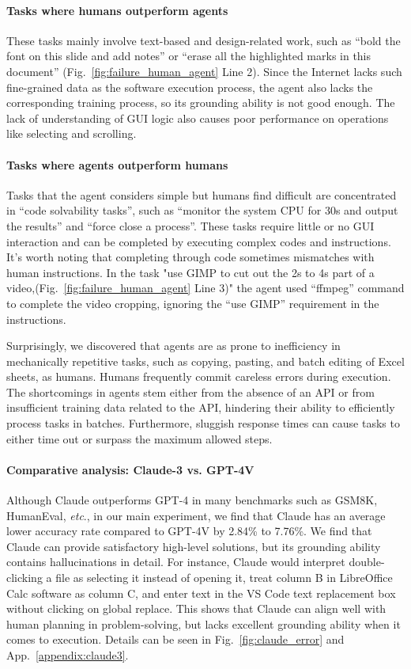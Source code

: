 \paragraph{Tasks where humans outperform agents
} These tasks mainly involve text-based and design-related work, such as ``bold the font on this slide and add notes'' or ``erase all the highlighted marks in this document'' (Fig.~\ref{fig:failure_human_agent} Line 2). 
Since the Internet lacks such fine-grained data as the software execution process, the agent also lacks the corresponding training process, so its grounding ability is not good enough.
The lack of understanding of GUI logic also causes poor performance on operations like selecting and scrolling.

\paragraph{Tasks where agents outperform humans} Tasks that the agent considers simple but humans find difficult are concentrated in ``code solvability tasks'', such as ``monitor the system CPU for 30s and output the results'' and ``force close a process''. 
These tasks require little or no GUI interaction and can be completed by executing complex codes and instructions. 
It's worth noting that completing through code sometimes mismatches with human instructions. 
In the task "use GIMP to cut out the 2s to 4s part of a video,(Fig.~\ref{fig:failure_human_agent} Line 3)" the agent used ``ffmpeg'' command to complete the video cropping, ignoring the ``use GIMP'' requirement in the instructions.

Surprisingly, we discovered that agents are as prone to inefficiency in mechanically repetitive tasks, such as copying, pasting, and batch editing of Excel sheets, as humans. 
Humans frequently commit careless errors during execution. 
The shortcomings in agents stem either from the absence of an API or from insufficient training data related to the API, hindering their ability to efficiently process tasks in batches. 
Furthermore, sluggish response times can cause tasks to either time out or surpass the maximum allowed steps.

\paragraph{Comparative analysis: Claude-3 vs. GPT-4V}
Although Claude outperforms GPT-4 in many benchmarks such as GSM8K, HumanEval, \textit{etc}., in our main experiment, we find that Claude has an average lower accuracy rate compared to GPT-4V by 2.84\% to 7.76\%. 
We find that Claude can provide satisfactory high-level solutions, but its grounding ability contains hallucinations in detail.
For instance, Claude would interpret double-clicking a file as selecting it instead of opening it, treat column B in LibreOffice Calc software as column C, and enter text in the VS Code text replacement box without clicking on global replace. 
This shows that Claude can align well with human planning in problem-solving, but lacks excellent grounding ability when it comes to execution. Details can be seen in Fig.~\ref{fig:claude_error} and App.~\ref{appendix:claude3}.
